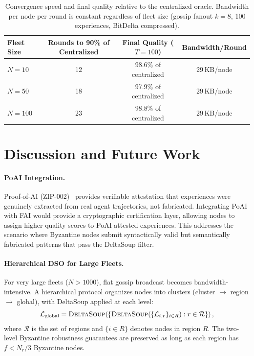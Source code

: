\documentclass[11pt]{article}
\begin{document}
\begin{table}[H]
\centering
\begin{tabular}{lccc}
\toprule
Fleet Size & Rounds to 90\% of Centralized & Final Quality ($T=100$) & Bandwidth/Round \\
\midrule
$N=10$ & 12 & 98.6\% of centralized & 29\,KB/node \\
$N=50$ & 18 & 97.9\% of centralized & 29\,KB/node \\
$N=100$ & 23 & 98.8\% of centralized & 29\,KB/node \\
\bottomrule
\end{tabular}
\caption{Convergence speed and final quality relative to the centralized oracle.
Bandwidth per node per round is constant regardless of fleet size (gossip fanout
$k=8$, 100 experiences, BitDelta compressed).}
\label{tab:convergence}
\end{table}

\section{Discussion and Future Work}
\label{sec:discussion}

\paragraph{PoAI Integration.}
Proof-of-AI (ZIP-002)~\cite{hanzo2026poai} provides verifiable attestation
that experiences were genuinely extracted from real agent trajectories, not
fabricated. Integrating PoAI with FAI would provide a cryptographic
certification layer, allowing nodes to assign higher quality scores to
PoAI-attested experiences. This addresses the scenario where Byzantine nodes
submit syntactically valid but semantically fabricated patterns that pass
the DeltaSoup filter.

\paragraph{Hierarchical DSO for Large Fleets.}
For very large fleets ($N > 1000$), flat gossip broadcast becomes bandwidth-
intensive. A hierarchical protocol organizes nodes into clusters
(cluster $\to$ region $\to$ global), with DeltaSoup applied at each level:
\begin{equation}
    \mathcal{L}_{\text{global}} = \textsc{DeltaSoup}\!\left(
        \left\{\textsc{DeltaSoup}(\{\mathcal{L}_{i,r}\}_{i \in R}) : r \in \mathcal{R}\right\}
    \right),
\end{equation}
where $\mathcal{R}$ is the set of regions and $\{i \in R\}$ denotes nodes in
region $R$. The two-level Byzantine robustness guarantees are preserved as
long as each region has $f < N_r / 3$ Byzantine nodes.
\end{document}
